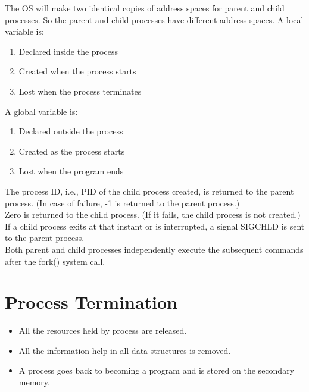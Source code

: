 \documentclass[11pt]{article}
\begin{document}
The OS will make two identical copies of address spaces for parent and child processes. So the parent and child processes have different address spaces.
A local variable is:
\begin{enumerate}
	\item Declared inside the process
	\item  Created when the process starts
	\item  Lost when the process terminates
\end{enumerate}

A global variable is:
\begin{enumerate}
	\item Declared outside the process
	\item Created as the process starts
	\item Lost when the program ends
\end{enumerate}

The process ID, i.e., PID of the child process created, is returned to the parent process. (In case of failure, -1 is returned to the parent process.) \\
Zero is returned to the child process. (If it fails, the child process is not created.) If a child process exits at that instant or is interrupted, a signal SIGCHLD is sent to the parent process. \\
Both parent and child processes independently execute the subsequent commands after the fork() system call.


\section{Process Termination}
\begin{itemize}
	\item All the resources held by process are released.
	\item All the information help in all data structures is removed.
	\item A process goes back to becoming a program and is stored on the secondary memory.
\end{itemize}
\end{document}
